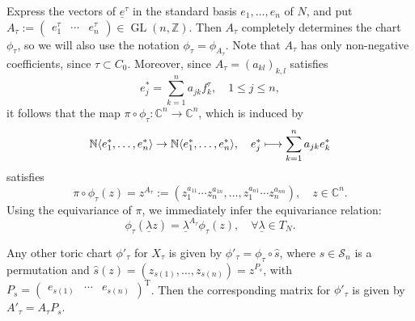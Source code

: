 \documentclass[JEP,XML,SOM,Unicode,NoFloatCountersInSection]{cedram}
\let\mathcal\mathscr
\theoremstyle{definition}
\newcommand\mto{\mathchoice{\longmapsto}{\mapsto}{\mapsto}{\mapsto}}
\let\un\underline
\newcommand{\CC}{\mathbb{C}}
\newcommand{\NN}{\mathbb{N}}
\newcommand{\ZZ}{\mathbb{Z}}
\DeclareMathOperator{\GL}{GL}
\newcommand{\transp}[1]{{#1}^{\scriptscriptstyle\mathrm{T}}}
\begin{document}
Express the vectors of $\un e^\tau$ in the standard basis $e_1,\ldots, e_n$ of $N$, and put $A_\tau:=\begin{pmatrix} e_1^\tau &\cdots & e_n^\tau\end{pmatrix}\in\GL(n,\ZZ)$. Then $A_\tau$ completely determines the chart $\phi_\tau$, so we will also use the notation $\phi_\tau=\phi_{A_\tau}$. Note that $A_\tau$ has only non-negative coefficients, since $\tau\subset C_0$. Moreover, since $A_\tau=(a_{kl})_{k,l}$ satisfies
\begin{equation*}
e_j^*=\sum_{k=1}^na_{jk}f_k^\tau, \quad 1\leq j\leq n,
\end{equation*}
it follows that the map $\pi\circ\phi_\tau:\CC^n\to\CC^n$, which is induced by
\begin{equation*}
\NN\langle e_1^*,\ldots, e_n^*\rangle\to \NN\langle e_1^*,\ldots, e_n^*\rangle, \quad e_j^*\mto \sum_{k=1}^na_{jk}e_k^*
\end{equation*}
satisfies
\begin{equation}\label{germeneTau}
\pi\circ\phi_\tau(z)=z^{A_\tau}:=(z_1^{a_{11}}\cdots z_n^{a_{1n}},\ldots,z_1^{a_{n1}}\cdots z_n^{a_{nn}}), \quad z\in\CC^n.
\end{equation}
Using the equivariance of $\pi$, we immediately infer the equivariance relation:
\begin{equation}\label{equivariance}
\phi_\tau(\un \lambda z)=\un \lambda^{A_\tau}\phi_\tau(z), \quad \forall \un \lambda\in T_N.
\end{equation}

Any other toric chart $\phi'_\tau$ for $X_\tau$ is given by $\phi'_{\tau}=\phi_\tau\circ\hat{s}$, where $s\in\mathcal{S}_n$ is a permutation and $\hat{s}(z)=(z_{s(1)},\ldots, z_{s(n)})=z^{P_s}$, with $P_s=\transp{\begin{pmatrix}
e_{s(1)} &\cdots &e_{s(n)}\end{pmatrix}}$.
Then the corresponding matrix for $\phi'_\tau$ is given by $A'_\tau=A_\tau P_s$.
\end{document}
